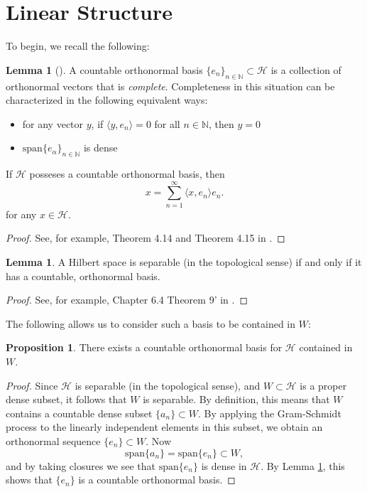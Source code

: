 \documentclass{dcthesis}
\numberwithin{equation}{section}
\numberwithin{equation}{section}
\theoremstyle{definition}
\newtheorem{proposition}[equation]{Proposition}
\newtheorem{lemma}[equation]{Lemma}
\begin{document}
\section{Linear Structure} %

To begin, we recall the following:

\begin{lemma}[]
\label{rmk-on_basis}
A countable orthonormal basis $\{e_n\}_{n\in\mathbb{N}}\subset\mathcal{H}$ is a collection of orthonormal vectors that is \emph{complete}. Completeness in this situation can be characterized in the following equivalent ways:
	\begin{itemize}
		\item for any vector $y$, if $\langle y, e_n\rangle = 0$ for all $n\in\mathbb{N}$, then $y=0$
		\item $\text{span}\{e_\alpha\}_{n\in\mathbb{N}}$ is dense 
	\end{itemize}
	If $\mathcal{H}$ posseses a countable orthonormal basis, then  
	\begin{equation*}
		x=\sum_{n=1}^\infty\langle x, e_n\rangle e_n.
	\end{equation*}
	for any $x\in\mathcal{H}$. 
\end{lemma}
\begin{proof}
	See, for example, Theorem 4.14 and Theorem 4.15 in \cite{young_1988}.
\end{proof}

\begin{lemma}
	A Hilbert space is separable (in the topological sense) if and only if it has a countable, orthonormal basis.
\end{lemma}
\begin{proof}
	See, for example, Chapter 6.4 Theorem 9' in \cite{lax_2002}.
\end{proof}

The following allows us to consider such a basis to be contained in $W$:
\begin{proposition}
\label{prop_en_in_w}
	There exists a countable orthonormal basis for $\mathcal{H}$ contained in $W$.
\end{proposition}
\begin{proof}
	Since $\mathcal{H}$ is separable (in the topological sense), and $W\subset\mathcal{H}$ is a proper dense subset, it follows that $W$ is separable. By definition, this means that $W$ contains a countable dense subset $\{a_n\}\subset W$. By applying the Gram-Schmidt process to the linearly independent elements in this subset, we obtain an orthonormal sequence $\{e_n\}\subset W$. Now
	\begin{equation*}
		\text{span}\{a_n\} = \text{span}\{e_n\} \subset W,
	\end{equation*}
	and by taking closures we see that $\text{span}\{e_n\}$ is dense in $\mathcal{H}$. By Lemma \ref{rmk-on_basis}, this shows that $\{e_n\}$ is a countable orthonormal basis. 
\end{proof}
\end{document}
